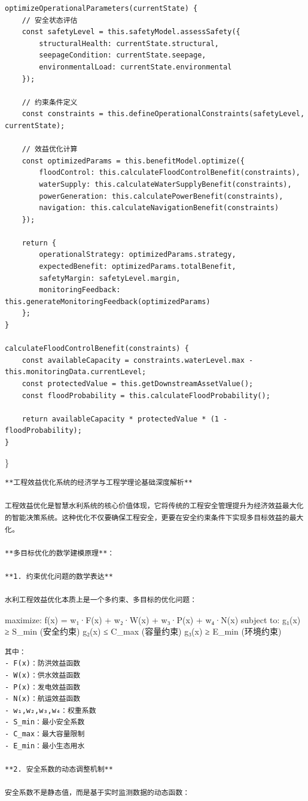 \begin{verbatim}
optimizeOperationalParameters(currentState) {
    // 安全状态评估
    const safetyLevel = this.safetyModel.assessSafety({
        structuralHealth: currentState.structural,
        seepageCondition: currentState.seepage,
        environmentalLoad: currentState.environmental
    });
    
    // 约束条件定义
    const constraints = this.defineOperationalConstraints(safetyLevel, currentState);
    
    // 效益优化计算
    const optimizedParams = this.benefitModel.optimize({
        floodControl: this.calculateFloodControlBenefit(constraints),
        waterSupply: this.calculateWaterSupplyBenefit(constraints),
        powerGeneration: this.calculatePowerBenefit(constraints),
        navigation: this.calculateNavigationBenefit(constraints)
    });
    
    return {
        operationalStrategy: optimizedParams.strategy,
        expectedBenefit: optimizedParams.totalBenefit,
        safetyMargin: safetyLevel.margin,
        monitoringFeedback: this.generateMonitoringFeedback(optimizedParams)
    };
}

calculateFloodControlBenefit(constraints) {
    const availableCapacity = constraints.waterLevel.max - this.monitoringData.currentLevel;
    const protectedValue = this.getDownstreamAssetValue();
    const floodProbability = this.calculateFloodProbability();
    
    return availableCapacity * protectedValue * (1 - floodProbability);
}
\end{verbatim}

\}

\begin{lstlisting}
**工程效益优化系统的经济学与工程学理论基础深度解析**

工程效益优化是智慧水利系统的核心价值体现，它将传统的工程安全管理提升为经济效益最大化的智能决策系统。这种优化不仅要确保工程安全，更要在安全约束条件下实现多目标效益的最大化。

**多目标优化的数学建模原理**：

**1. 约束优化问题的数学表达**

水利工程效益优化本质上是一个多约束、多目标的优化问题：
\end{lstlisting}

maximize: f(x) = w₁·F(x) + w₂·W(x) + w₃·P(x) + w₄·N(x) subject to: g₁(x) ≥ S\_min (安全约束) g₂(x) ≤ C\_max (容量约束) g₃(x) ≥ E\_min (环境约束)

\begin{lstlisting}
其中：
- F(x)：防洪效益函数
- W(x)：供水效益函数  
- P(x)：发电效益函数
- N(x)：航运效益函数
- w₁,w₂,w₃,w₄：权重系数
- S_min：最小安全系数
- C_max：最大容量限制
- E_min：最小生态用水

**2. 安全系数的动态调整机制**

安全系数不是静态值，而是基于实时监测数据的动态函数：
\end{lstlisting}

